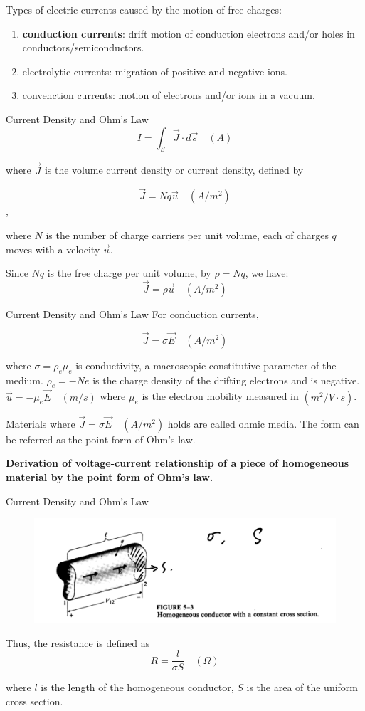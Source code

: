 \documentclass[xcolor={dvipsnames}]{beamer}
\begin{document}
\begin{frame}
Types of electric currents caused by the motion of free charges:
\begin{enumerate}
  \item \textbf{conduction currents}: drift motion of conduction electrons and/or holes in conductors/semiconductors.
  \item electrolytic currents: migration of positive and negative ions.
  \item convenction currents: motion of electrons and/or ions in a vacuum.
\end{enumerate}
\end{frame}
\begin{frame}{Current Density and Ohm's Law}
$$I = \int_S \vec{J}\cdot d\vec{s}\quad (A)$$

where $\vec{J}$ is the volume current density or current density, defined by 

$$\vec{J} = Nq\vec{u}\quad (A/m^2)$$,

where $N$ is the number of charge carriers per unit volume, each of charges $q$ moves with a velocity $\vec{u}$.

Since $Nq$ is the free charge per unit volume, by $\rho = Nq$, we have:
$$
\vec{J} = \rho \vec{u}\quad (A/m^2)
$$
\end{frame}
\begin{frame}{Current Density and Ohm's Law}
For conduction currents,

$$
\vec{J} = \sigma \vec{E} \quad (A/m^2)
$$

where $\sigma = \rho_e\mu_e$ is conductivity, a macroscopic constitutive parameter of the medium. $\rho_e = -Ne$ is the charge density of the drifting electrons and is negative. $\vec{u} = -\mu_e \vec{E} \quad(m/s)$ where $\mu_e$ is the electron mobility measured in $(m^2/V\cdot s)$.

Materials where $
\vec{J} = \sigma \vec{E} \quad (A/m^2)
$ holds are called ohmic media. The form can be referred as the point form of Ohm's law.

\textbf{Derivation of voltage-current relationship of a piece of homogeneous material by the point form of Ohm's law.}
\end{frame}
\begin{frame}{Current Density and Ohm's Law}
\begin{figure}[H]
  \centering
  \includegraphics[width=0.7\linewidth]{5_15.png}
\end{figure}
Thus, the resistance is defined as
$$
R = \frac{l}{\sigma S} \quad (\Omega)
$$

where $l$ is the length of the homogeneous conductor, $S$ is the area of the uniform cross section.
\end{frame}
\end{document}
